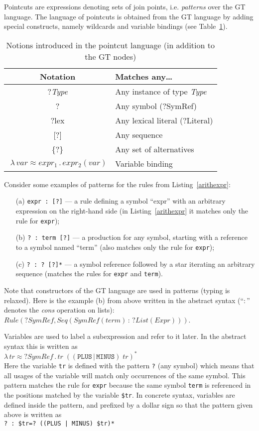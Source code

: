 \documentclass{IOS-Book-Article}     %
\newcommand{\abstr}[3]{\lambda \, #1 \approx #2 \,.\, #3}
\newcommand{\tabref}[1]{Table~\ref{#1}}
\newcommand{\lstref}[1]{Listing~\ref{#1}}
\begin{document}
Pointcuts are expressions denoting sets of join points, i.e. \emph{patterns} over the GT language. The language of pointcuts is obtained from the GT language by adding special constructs, namely wildcards and variable bindings (see \tabref{wildcards}).
%
\begin{table}[h!]
\centering
\begin{tabular}{|@{}c|l|}
	\hline
	\bf Notation & \bf Matches any\ldots \\
	\hline
	?\emph{Type} & Any instance of type \emph{Type} \\
	? & Any symbol (?SymRef)\\
	?lex & Any lexical literal (?Literal) \\
	{}[?]& Any sequence \\
	\{?\}& Any set of alternatives \\
	$\;\abstr{var}{expr_1}{expr_2(var)}$ & Variable binding \\
	\hline
\end{tabular}
\caption{Notions introduced in the pointcut language (in addition to the GT nodes)}\label{wildcards}
\end{table}
%
Consider some examples of patterns for the rules from \lstref{arithexpr}:
\begin{itemize}
	\item[(a)] \lstinline!expr : [?]! --- a rule defining a symbol ``expr'' with an arbitrary expression on the right-hand side (in \lstref{arithexpr} it matches only the rule for \texttt{expr});
	\item[(b)] \lstinline!? : term [?]! --- a production for any symbol, starting with a reference to a symbol named ``term'' (also matches only the rule for \texttt{expr});
	\item[(c)] \lstinline!? : ? [?]*! --- a symbol reference followed by a star iterating an arbitrary sequence (matches the rules for \texttt{expr} and \texttt{term}).
\end{itemize}
Note that constructors of the GT language are used in patterns (typing is relaxed). Here is the example (b) from above written in the abstract syntax (``$:$'' denotes the \emph{cons} operation on lists):
 $Rule(?SymRef, Seq(SymRef(term)\,:\,?List(Expr)))$.

Variables are used to label a subexpression and refer to it later. In the abstract syntax this is written as\\
\indent
$
\abstr{tr}{?SymRef}{tr\;((\mathtt{PLUS} \,|\, \mathtt{MINUS})\; tr)^*}
$\\
Here the variable \texttt{tr} is defined with the pattern \texttt{?} (any symbol) which means that all usages of the variable will match only occurrences of the same symbol. This pattern matches the rule for \texttt{expr} because the same symbol \texttt{term} is referenced in the positions matched by the variable \texttt{\$tr}. In concrete syntax, variables are defined inside the pattern, and prefixed by a dollar sign so that the pattern given above is written as\\
\indent\lstinline!? : $tr=? ((PLUS | MINUS) $tr)*!
\end{document}

